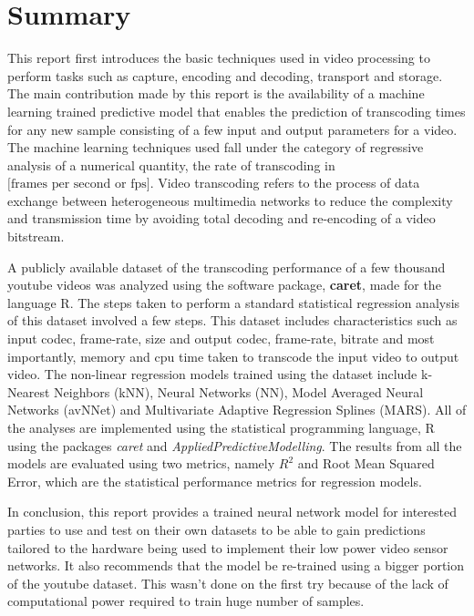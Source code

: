 \documentclass[letterpaper,12pt,titlepage,oneside,final]{report}
\newcommand{\package}[1]{\textbf{#1}} %
\begin{document}
\chapter*{Summary}
    This report first introduces the basic techniques used in video processing to perform tasks such as capture, encoding and decoding, transport and storage. The main contribution made by this report is the availability of a machine learning trained predictive model that enables the prediction of transcoding times for any new sample consisting of a few input and output parameters for a video. The machine learning techniques used fall under the category of regressive analysis of a numerical quantity, the rate of transcoding in $\text{[frames per second or fps]}$. Video transcoding refers to the process of data exchange between heterogeneous multimedia networks to reduce the complexity and transmission time by avoiding total decoding and re-encoding of a video bitstream.

    A publicly available dataset of the transcoding performance of a few thousand youtube videos was analyzed using the software package, \package{caret}, made for the language R. The steps taken to perform a standard statistical regression analysis of this dataset involved a few steps. This dataset includes characteristics such as input codec, frame-rate, size and output codec, frame-rate, bitrate and most importantly, memory and cpu time taken to transcode the input video to output video. The non-linear regression models trained using the dataset include k-Nearest Neighbors (kNN), Neural Networks (NN), Model Averaged Neural Networks (avNNet) and Multivariate Adaptive Regression Splines (MARS). All of the analyses are implemented using the statistical programming language, R using the packages \textit{caret} and \textit{AppliedPredictiveModelling}. The results from all the models are evaluated using two metrics, namely $R^2$ and Root Mean Squared Error, which are the statistical performance metrics for regression models.

    In conclusion, this report provides a trained neural network model for interested parties to use and test on their own datasets to be able to gain predictions tailored to the hardware being used to implement their low power video sensor networks. It also recommends that the model be re-trained using a bigger portion of the youtube dataset. This wasn't done on the first try because of the lack of computational power required to train huge number of samples.
\end{document}
